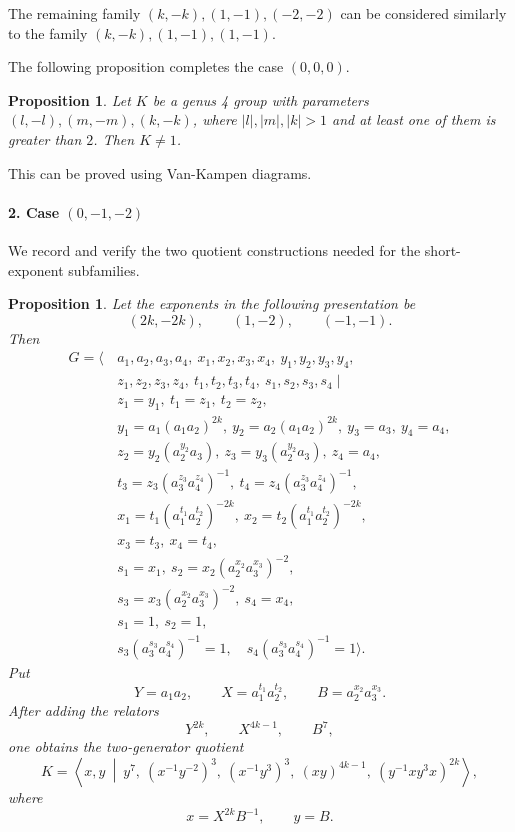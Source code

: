\documentclass{article}
\newtheorem{prop}[theorem]{Proposition}
\begin{document}
The remaining family $(k,-k),(1,-1),(-2,-2)$ can be considered similarly to the family $(k,-k),(1,-1),(1,-1)$.

\bigskip
The following proposition completes the case $(0,0,0)$.
\begin{prop} Let $K$ be a genus 4 group with parameters $(l,-l),(m,-m),(k,-k)$, where $|l|,|m|,|k|>1$ and at least one of them is greater than $2$. Then $K\neq 1$.\end{prop}
This can be proved using Van-Kampen diagrams.

\paragraph{2. Case $(0,-1,-2)$}

We record and verify the two quotient constructions needed for the
short-exponent subfamilies.

\begin{prop}
Let the exponents in the following presentation be
\[
   (2k,-2k),\qquad (1,-2),\qquad (-1,-1).
\]
Then
\[
\begin{aligned}
G = \langle\,& a_1,a_2,a_3,a_4,\ x_1,x_2,x_3,x_4,\ y_1,y_2,y_3,y_4,\\
& z_1,z_2,z_3,z_4,\ t_1,t_2,t_3,t_4,\ s_1,s_2,s_3,s_4 \mid \\
& z_1 = y_1,\ t_1 = z_1,\ t_2 = z_2, \\
& y_1 = a_1 (a_1 a_2)^{2k},\ y_2 = a_2 (a_1 a_2)^{2k},\ y_3 = a_3,\ y_4 = a_4, \\
& z_2 = y_2 (a_2^{y_2} a_3),\ z_3 = y_3 (a_2^{y_2} a_3),\ z_4 = a_4, \\
& t_3 = z_3 (a_3^{z_3} a_4^{z_4})^{-1},\ t_4 = z_4 (a_3^{z_3} a_4^{z_4})^{-1}, \\
& x_1 = t_1 (a_1^{t_1} a_2^{t_2})^{-2k},\ x_2 = t_2 (a_1^{t_1} a_2^{t_2})^{-2k}, \\
& x_3 = t_3,\ x_4 = t_4, \\
& s_1 = x_1,\ s_2 = x_2 (a_2^{x_2} a_3^{x_3})^{-2}, \\
& s_3 = x_3 (a_2^{x_2} a_3^{x_3})^{-2},\ s_4 = x_4, \\
& s_1 = 1,\ s_2 = 1, \\
& s_3 (a_3^{s_3} a_4^{s_4})^{-1}=1,\quad
  s_4 (a_3^{s_3} a_4^{s_4})^{-1}=1
\rangle .
\end{aligned}
\]
Put
\[
 Y=a_1a_2,\qquad
 X=a_1^{t_1}a_2^{t_2},\qquad
 B=a_2^{x_2}a_3^{x_3}.
\]
After adding the relators
\[
Y^{2k},\qquad X^{4k-1},\qquad B^7,
\]
one obtains the two-generator quotient
\[
K = \left\langle x,y \ \middle|\
 y^{7},\ (x^{-1}y^{-2})^{3},\ (x^{-1}y^{3})^{3},\
 (xy)^{4k-1},\ (y^{-1}xy^{3}x)^{2k}
\right\rangle ,
\]
where
\[
   x=X^{2k}B^{-1},\qquad y=B.
\]
\end{prop}
\end{document}
